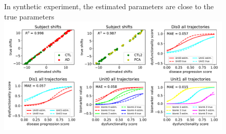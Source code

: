 \documentclass[portrait,a0,final,20pt]{a0poster}
\newcommand{\fnt}[1]{\LARGE{#1}}
\begin{document}
{\begin{multicols}{2}
% 
% 
% 

\columnbreak


\vspace{0.6em}
\begin{figure}[H]
\fnt{In synthetic experiment, the estimated parameters are close to the true parameters}\\
\includegraphics[width=\columnwidth]{../figures/compTrueParams105_synth1_JMD.pdf}
  \label{fig:dktSynthTrajCompTrue}
\end{figure}


\end{multicols}}
\end{document}
